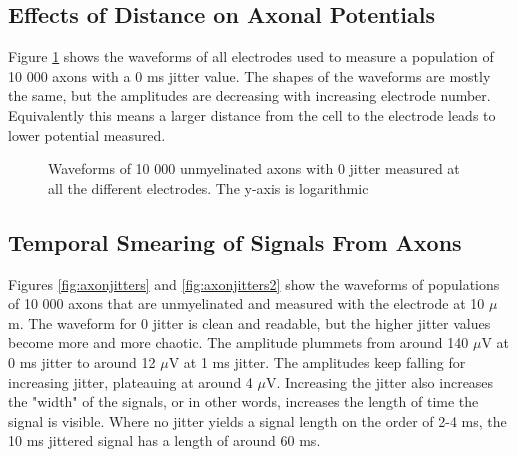 \documentclass[final, a4paper,masters,en,listoffigures,listoftables,norwegiandates]{NMBU}
\begin{document}
\subsection{Effects of Distance on Axonal Potentials}
Figure \ref{fig:axonmyenelecswav} shows the waveforms of all electrodes used to measure a population of 10 000 axons with a 0 ms jitter value. The shapes of the waveforms are mostly the same, but the amplitudes are decreasing with increasing electrode number. Equivalently this means a larger distance from the cell to the electrode leads to lower potential measured. 

\begin{figure}[h]
    \centering
    \caption{Waveforms of 10 000 unmyelinated axons with 0 jitter measured at all the different electrodes. The y-axis is logarithmic}
    \label{fig:axonmyenelecswav}
\end{figure}

\subsection{Temporal Smearing of Signals From Axons}
Figures \ref{fig:axonjitters} and \ref{fig:axonjitters2} show the waveforms of populations of 10 000 axons that are unmyelinated and measured with the electrode at 10 $\mu$m. The waveform for 0 jitter is clean and readable, but the higher jitter values become more and more chaotic. The amplitude plummets from around 140 $\mu$V at 0 ms jitter to around 12 $\mu$V at 1 ms jitter. The amplitudes keep falling for increasing jitter, plateauing at around 4 $\mu$V. Increasing the jitter also increases the "width" of the signals, or in other words, increases the length of time the signal is visible. Where no jitter yields a signal length on the order of 2-4 ms, the 10 ms jittered signal has a length of around 60 ms. 
\end{document}
